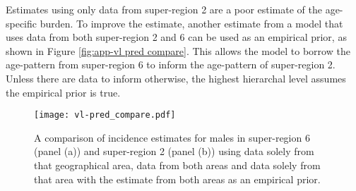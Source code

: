Estimates using only data from super-region 2 are a poor estimate of
the age-specific burden.  To improve the estimate, another estimate
from a model that uses data from both super-region 2 and 6 can be used
as an empirical prior, as shown in Figure \ref{fig:app-vl pred
  compare}.  This allows the model to borrow the age-pattern from
super-region 6 to inform the age-pattern of super-region 2.  Unless
there are data to inform otherwise, the highest hierarchal level
assumes the empirical prior is true.

    \begin{figure}[h]
        \begin{center}
            \texttt{[image: vl-pred\_compare.pdf]}
            \caption{A comparison of incidence estimates for males in
              super-region 6 (panel (a)) and super-region 2 (panel
              (b)) using data solely from that geographical area, data
              from both areas and data solely from that area with the
              estimate from both areas as an empirical prior.}
            \label{fig:app-vl pred compare}
        \end{center}
    \end{figure} 

